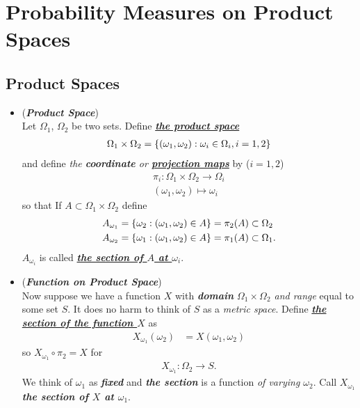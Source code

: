 \documentclass[11pt]{article}
\begin{document}
\section{Probability Measures on Product Spaces}
\subsection{Product Spaces}
\begin{itemize}
\item \begin{definition} (\emph{\textbf{Product Space}})\\
Let $\Omega_1$, $\Omega_2$ be two sets. Define \underline{\emph{\textbf{the product space}}}
\begin{align*}
\Omega_{1}\times \Omega_{2} = \left\{(\omega_1, \omega_2) : \omega_i \in \Omega_i, i = 1, 2\right\}
\end{align*}
and define \emph{the \textbf{coordinate} or \underline{\textbf{projection maps}}} by ($i = 1, 2$)
\begin{align*}
\pi_i: \Omega_{1}\times \Omega_{2} \rightarrow \Omega_i \\
(\omega_1, \omega_2) \mapsto \omega_i
\end{align*}
so that If $A \subset \Omega_{1}\times \Omega_{2}$ define
\begin{align*}
A_{\omega_1} &= \left\{\omega_2: (\omega_1, \omega_2) \in A\right\} = \pi_2(A) \subset \Omega_2 \\
A_{\omega_2} &= \left\{\omega_1: (\omega_1, \omega_2) \in A\right\} = \pi_1(A) \subset \Omega_1.
\end{align*} $A_{\omega_i}$ is called \underline{\emph{\textbf{the section of $A$ at $\omega_i$}}}.
\end{definition}

\item \begin{definition}  (\emph{\textbf{Function on Product Space}})\\
Now suppose we have a function $X$ with \emph{\textbf{domain} $\Omega_{1}\times \Omega_{2}$ and range} equal to some set $S$. It does no harm to think of $S$ as a \emph{metric space}. Define \underline{\emph{\textbf{the section of the function $X$}}} as
\begin{align*}
X_{\omega_1}(\omega_2) &= X(\omega_1, \omega_2)
\end{align*}
so $X_{\omega_1} \circ \pi_2 = X$ for
\begin{align*}
X_{\omega_1}: \Omega_2 \rightarrow S.
\end{align*}
We think of $\omega_1$ as \emph{\textbf{fixed}} and \textbf{\emph{the section}} is a function \emph{of varying $\omega_2$}. Call $X_{\omega_1}$ \emph{\textbf{the section of $X$ at $\omega_1$}}.
\end{definition}


\end{itemize}
\end{document}
